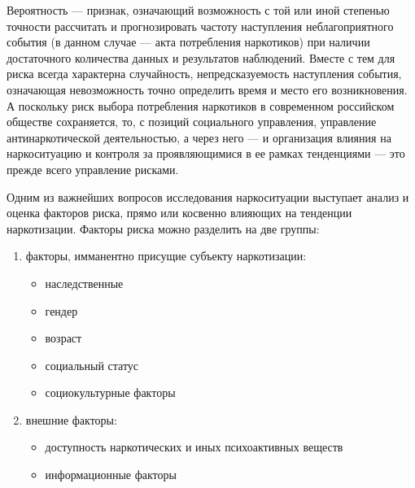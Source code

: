 \documentclass[a4paper,14pt]{article}
\begin{document}
Вероятность –-- признак, означающий возможность с той или иной степенью точности
рассчитать и прогнозировать частоту наступления неблагоприятного события (в
данном случае --– акта потребления наркотиков) при наличии достаточного
количества данных и результатов наблюдений. Вместе с тем для риска всегда
характерна случайность, непредсказуемость наступления события, означающая
невозможность точно определить время и место его возникновения. А поскольку риск
выбора потребления наркотиков в современном российском обществе сохраняется, то,
с позиций социального управления, управление антинаркотической деятельностью, а
через него –-- и организация влияния на наркоситуацию и контроля за
проявляющимися в ее рамках тенденциями –-- это прежде всего управление рисками.

Одним из важнейших вопросов исследования наркоситуации выступает анализ и
оценка факторов риска, прямо или косвенно влияющих на тенденции наркотизации. 
Факторы риска можно разделить на две группы:
\begin{enumerate}
    \item факторы, имманентно присущие субъекту наркотизации:
        \begin{itemize}
            \item наследственные
            \item гендер
            \item возраст
            \item социальный статус
            \item социокультурные факторы
        \end{itemize}
    \item внешние факторы:
        \begin{itemize}
            \item доступность наркотических и иных психоактивных веществ
            \item информационные факторы	
        \end{itemize}
\end{enumerate}	
\end{document}
